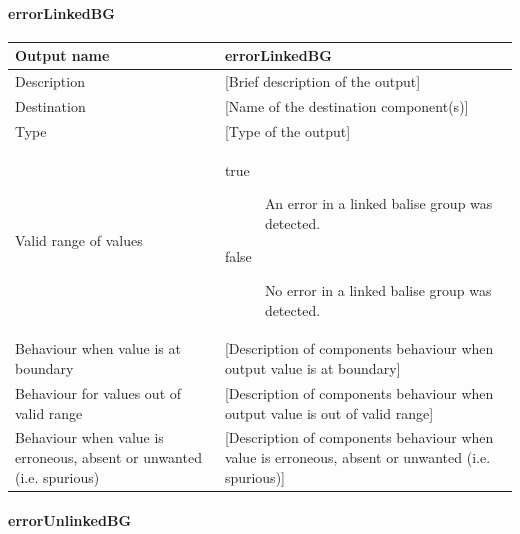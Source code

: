 \paragraph{errorLinkedBG}

\begin{longtable}{p{}p{}}
\toprule
Output name				& errorLinkedBG \\
\midrule
Description				& [Brief description of the output] \\
\midrule
Destination				& [Name of the destination component(s)] \\ 
\midrule
Type					& [Type of the output] \\
\midrule
Valid range of values	& \begin{description}
\item[true] An error in a linked balise group was detected.
\item[false] No error in a linked balise group was detected.
\end{description} \\
\midrule
Behaviour when value is at boundary	& [Description of components behaviour when output value is at boundary] \\
\midrule
Behaviour for values out of valid range	& [Description of components behaviour when output value is out of valid range] \\
\midrule
Behaviour when value is erroneous, absent or unwanted (i.e. spurious) & [Description of components behaviour when value is erroneous, absent or unwanted (i.e. spurious)] \\
\bottomrule
\end{longtable}


\paragraph{errorUnlinkedBG}

